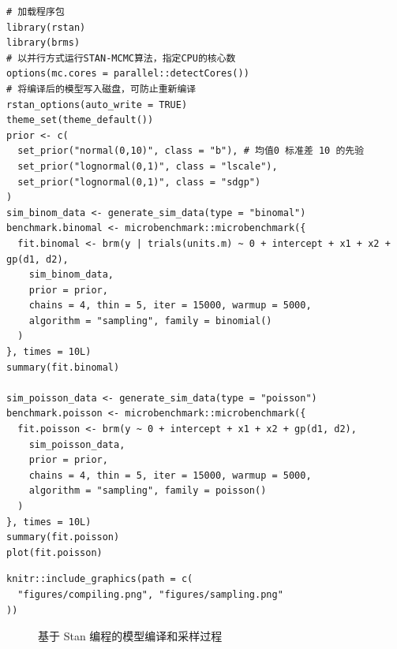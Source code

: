 \documentclass[12pt,a4paper,UTF8,twoside]{book}
\theoremstyle{definition}
\theoremstyle{definition}
\theoremstyle{definition}
\theoremstyle{remark}
\begin{document}
\begin{verbatim}
# 加载程序包
library(rstan)
library(brms)
# 以并行方式运行STAN-MCMC算法，指定CPU的核心数
options(mc.cores = parallel::detectCores())
# 将编译后的模型写入磁盘，可防止重新编译
rstan_options(auto_write = TRUE)
theme_set(theme_default())
prior <- c(
  set_prior("normal(0,10)", class = "b"), # 均值0 标准差 10 的先验
  set_prior("lognormal(0,1)", class = "lscale"),
  set_prior("lognormal(0,1)", class = "sdgp")
)
sim_binom_data <- generate_sim_data(type = "binomal")
benchmark.binomal <- microbenchmark::microbenchmark({
  fit.binomal <- brm(y | trials(units.m) ~ 0 + intercept + x1 + x2 + gp(d1, d2),
    sim_binom_data,
    prior = prior,
    chains = 4, thin = 5, iter = 15000, warmup = 5000,
    algorithm = "sampling", family = binomial()
  )
}, times = 10L)
summary(fit.binomal)

sim_poisson_data <- generate_sim_data(type = "poisson")
benchmark.poisson <- microbenchmark::microbenchmark({
  fit.poisson <- brm(y ~ 0 + intercept + x1 + x2 + gp(d1, d2),
    sim_poisson_data,
    prior = prior,
    chains = 4, thin = 5, iter = 15000, warmup = 5000, 
    algorithm = "sampling", family = poisson()
  )
}, times = 10L)
summary(fit.poisson)
plot(fit.poisson)
\end{verbatim}

\begin{verbatim}
knitr::include_graphics(path = c(
  "figures/compiling.png", "figures/sampling.png"
))
\end{verbatim}

\begin{figure}

{\centering {}

}

\caption{基于 Stan 编程的模型编译和采样过程}\label{fig:compiling-sampling}
\end{figure}
\end{document}
